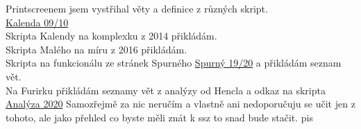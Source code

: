 \documentclass[12pt,a4paper]{article}
\begin{document}
Printscreenem jsem vystřihal věty a definice z různých skript.\\
\href{http://www.karlin.mff.cuni.cz/~kalenda/pages/uka0910.php?ukatype=texty}{Kalenda 09/10}\\
Skripta Kalendy na komplexku z 2014 přikládám.\\
Skripta Malého na míru z 2016 přikládám.\\
Skripta na funkcionálu ze stránek Spurného \href{http://www.karlin.mff.cuni.cz/~spurny/pages/fa.php}{Spurný 19/20} a přikládám seznam vět.\\
Na Furirku přikládám seznamy vět z analýzy od Hencla a odkaz na skripta \href{http://www.karlin.mff.cuni.cz/~pick/analyza.pdf}{Analýza 2020}
Samozřejmě za nic neručím a vlastně ani nedoporučuju se učit jen z tohoto, ale jako přehled co byste měli znát k ssz to snad bude stačit. pis
\end{document}
